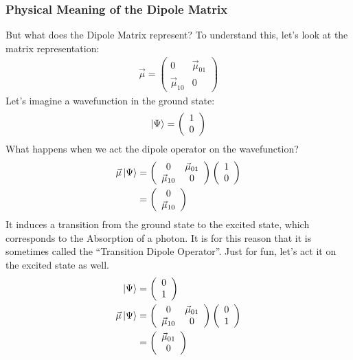 \subsubsection{Physical Meaning of the Dipole Matrix}
But what does the Dipole Matrix represent?  To understand this, let's look at the matrix representation:
\begin{align}
	\vec{\mu} = \left( \begin{array}{ccc}
		0 & \vec{\mu}_{01} \\
		\vec{\mu}_{10} & 0 \end{array} \right)
\end{align}
Let's imagine a wavefunction in the ground state:
\begin{align}
	\ket{\Psi} = \left( \begin{array}{ccc}
		1 \\
		0 \end{array} \right)
\end{align}
What happens when we act the dipole operator on the wavefunction?
\begin{align}
	\vec{\mu} \ket{\Psi} &= \left( \begin{array}{ccc}
		0 & \vec{\mu}_{01} \\
		\vec{\mu}_{10} & 0 \end{array} \right)
	\left( \begin{array}{ccc}
		1 \\
		0 \end{array} \right) \\
	 &= \left( \begin{array}{ccc}
		0 \\
		\vec{\mu}_{10} \end{array} \right)
\end{align}
It induces a transition from the ground state to the excited state, which corresponds to the Absorption of a photon.  It is for this reason that it is sometimes called the ``Transition Dipole Operator''.  Just for fun, let's act it on the excited state as well.
\begin{align}
	\ket{\Psi} &= \left( \begin{array}{ccc}
		0 \\
		1 \end{array} \right) \\
	\vec{\mu} \ket{\Psi} &= \left( \begin{array}{ccc}
		0 & \vec{\mu}_{01} \\
		\vec{\mu}_{10} & 0 \end{array} \right)
	\left( \begin{array}{ccc}
		0 \\
		1 \end{array} \right) \\
	 &= \left( \begin{array}{ccc}
		\vec{\mu}_{01} \\
		 0 \end{array} \right)
\end{align}
